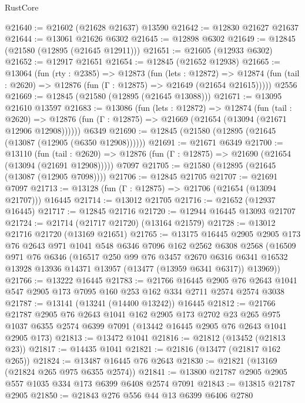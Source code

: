 \begin{lexlean}{RustCore}
\begin{coremodule}
@21640 := @21602 (@21628 @21637) @13590
@21642 := @12830 @21627 @21637
@21644 := @13061 @21626 @6302
@21645 := @12898 @6302
@21649 := @12845 (@21580 (@12895 (@21645 @12911)))
@21651 := @21605 (@12933 @6302)
@21652 := @12917 @21651
@21654 := @12845 (@21652 @12938)
@21665 := @13064
    (fun (rty : @2385) =>
    @12873
      (fun (lets : @12872) =>
      @12874 (fun (tail : @2620) => @12876 (fun (Γ : @12875) => @21649 (@21654 @21615)))))
    @2556
@21669 := @12845 (@21580 (@12895 (@21645 @13088)))
@21671 := @13095 @21610 @13597
@21683 := @13086
    (fun (lets : @12872) =>
    @12874
      (fun (tail : @2620) =>
      @12876 (fun (Γ : @12875) => @21669 (@21654 (@13094 (@21671 @12906 @12908))))))
    @6349
@21690 := @12845 (@21580 (@12895 (@21645 (@13087 (@12905 (@6350 @12908))))))
@21691 := @21671 @6349
@21700 := @13110
    (fun (tail : @2620) => @12876 (fun (Γ : @12875) => @21690 (@21654 (@13094 (@21691 @12908)))))
    @7097
@21705 := @21580 (@12895 (@21645 (@13087 (@12905 @7098))))
@21706 := @12845 @21705
@21707 := @21691 @7097
@21713 := @13128 (fun (Γ : @12875) => @21706 (@21654 (@13094 @21707))) @16445
@21714 := @13012 @21705
@21716 := @21652 (@12937 @16445)
@21717 := @12845 @21716
@21720 := @12944 @16445 @13093 @21707
@21724 := @21714 (@21717 @21720) (@13164 @21579)
@21728 := @13012 @21716 @21720 (@13169 @21651)
@21765 := @13175
    @16445
    @2905
    @2905
    @173
    @76
    @2643
    @971
    @1041
    @548
    @6346
    @7096
    @162
    @2562
    @6308
    @2568
    (@16509
      @971
      @76
      @6346
      (@16517
        @250
        @99
        @76
        @3457
        @2670
        @6316
        @6341
        @16532
        @13928
        @13936
        @14371
        @13957
        (@13477 (@13959 @6341 @6317))
        @13969))
@21766 := @13222 @16445
@21783 := @21766
    @16445
    @2905
    @76
    @2643
    @1041
    @547
    @2905
    @173
    @7095
    @160
    @253
    @162
    @334
    @2711
    @2574
    @2574
    @3038
@21787 := @13141 (@13241 (@14400 @13242)) @16445
@21812 := @21766
    @21787
    @2905
    @76
    @2643
    @1041
    @162
    @2905
    @173
    @2702
    @23
    @265
    @975
    @1037
    @6355
    @2574
    @6399
    @7091
    (@13442 @16445 @2905 @76 @2643 @1041 @2905 @173)
@21813 := @13472 @1041
@21816 := @21812 (@13452 (@21813 @23))
@21817 := @14435 @1041
@21821 := @21816 (@13477 (@21817 @162 @265))
@21824 := @13487 @16445 @76 @2643
@21830 := @21821 (@13169 (@21824 @265 @975 @6355 @2574))
@21841 := @13800 @21787 @2905 @2905 @557 @1035 @334 @173 @6399 @6408 @2574 @7091
@21843 := @13815 @21787 @2905
@21850 := @21843 @276 @556 @44 @13 @6399 @6406 @2780

\end{coremodule}
\end{lexlean}
